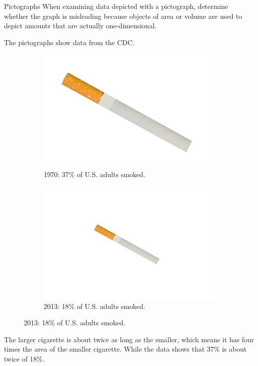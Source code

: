 \documentclass{beamer}
\begin{document}
\begin{frame}
\begin{block}{Pictographs}
When examining data depicted with a pictograph, determine whether the graph is misleading because objects of area or volume are used to depict amounts that are actually one-dimensional.
\end{block}\pause

\begin{example}
The pictographs show data from the CDC\@.
\begin{figure}
\begin{subfigure}{.5\textwidth}
  \centering
  \includegraphics[width=.6\linewidth]{Cigarette.png}
  \caption{1970: 37\% of U.S. adults smoked.}
\end{subfigure}%
\begin{subfigure}{.5\textwidth}
  \centering
  \includegraphics[width=.6\linewidth]{Cigarette_small.png}
  \caption{2013: 18\% of U.S. adults smoked.}
\end{subfigure}
\end{figure}
The larger cigarette is about twice as long as the smaller, which means it has four times the area of the smaller cigarette. While the data shows that 37\% is about twice of 18\%.
\end{example}
\end{frame}
\end{document}
